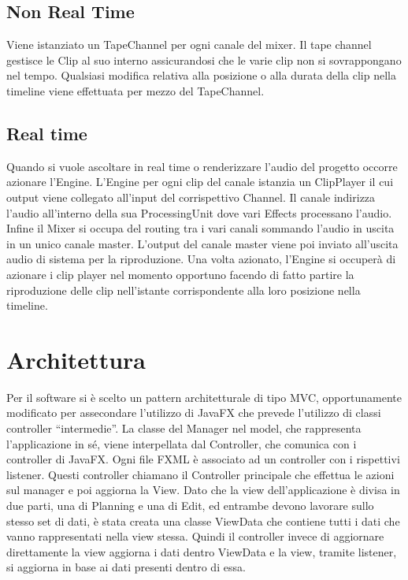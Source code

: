 \documentclass[a4paper,12pt]{report}
\begin{document}
\subsection{Non Real Time}
Viene istanziato un TapeChannel per ogni canale del mixer. Il tape channel gestisce le Clip al suo interno assicurandosi che le varie clip non si sovrappongano nel tempo. Qualsiasi modifica relativa alla posizione o alla durata della clip nella timeline viene effettuata per mezzo del TapeChannel.
\endsubsection
\subsection{Real time}
Quando si vuole ascoltare in real time o renderizzare l’audio del progetto occorre azionare l’Engine. 
L’Engine per ogni clip del canale istanzia un ClipPlayer il cui output viene collegato all’input del corrispettivo Channel. Il canale indirizza l’audio all’interno della sua ProcessingUnit dove vari Effects processano l’audio. Infine il Mixer si occupa del routing tra i vari canali sommando l’audio in uscita in un unico canale master. L’output del canale master viene poi inviato all’uscita audio di sistema per la riproduzione.
Una volta azionato, l’Engine si occuperà di azionare i clip player nel momento opportuno facendo di fatto partire la riproduzione delle clip nell’istante corrispondente alla loro posizione nella timeline.
\endsubsection
\endsection

\section{Architettura}
Per il software si è scelto un pattern architetturale di tipo MVC, opportunamente modificato per assecondare l’utilizzo di JavaFX che prevede l’utilizzo di classi controller “intermedie”. La classe del Manager nel model, che rappresenta l’applicazione in sé, viene interpellata dal Controller, che comunica con i controller di JavaFX. Ogni file FXML è associato ad un controller con i rispettivi listener. Questi controller chiamano il Controller principale che effettua le azioni sul manager e poi aggiorna la View. Dato che la view dell’applicazione è divisa in due parti, una di Planning e una di Edit, ed entrambe devono lavorare sullo stesso set di dati, è stata creata una classe ViewData che contiene tutti i dati che vanno rappresentati nella view stessa. Quindi il controller invece di aggiornare direttamente la view aggiorna i dati dentro ViewData e la view, tramite listener, si aggiorna in base ai dati presenti dentro di essa.
\end{document}
